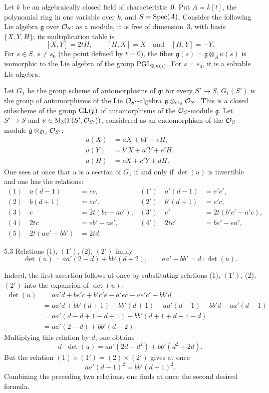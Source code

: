 \label{XIX.sec.5}
 Let $k$ be an algebraically closed field of characteristic~0. Put $A=k[t]$, the polynomial ring in one variable over $k$, and $S=\operatorname{Spec}(A)$. Consider the following Lie algebra $\mathfrak g$ over $\mathcal{O}_S$: as a module, it is free of dimension~3, with basis $\{X,Y,H\}$; its multiplication table is
\[
[X,Y]=2tH,\qquad[H,X]=X\quad\text{and}\quad[H,Y]=-Y.
\]
For $s\in S$, $s\ne s_0$ (the point defined by $t=0$), the fiber $\mathfrak g(s)=\mathfrak g\otimes_A\kappa(s)$ is isomorphic to the Lie algebra of the group $\operatorname{PGL}_{2,\kappa(s)}$. For $s=s_0$, it is a solvable Lie algebra.

 Let $G_1$ be the group scheme of automorphisms of $\mathfrak g$: for every $S'\to S$, $G_1(S')$ is the group of automorphisms of the Lie $\mathcal{O}_{S'}$-algebra $\mathfrak g\otimes_{\mathcal{O}_S}\mathcal{O}_{S'}$. This is a closed subscheme of the group $\operatorname{GL}(\mathfrak g)$ of automorphisms of the $\mathcal{O}_S$-module $\mathfrak g$. Let $S'\to S$ and $u\in\mathrm M_3(\Gamma(S',\mathcal{O}_{S'}))$, considered as an endomorphism of the $\mathcal{O}_S$-module $\mathfrak g\otimes_{\mathcal{O}_S}\mathcal{O}_{S'}$:
\[
\begin{aligned}
u(X)&=aX+bY+eH,\\
u(Y)&=b'X+a'Y+e'H,\\
u(H)&=cX+c'Y+dH.
\end{aligned}
\]
One sees at once that $u$ is a section of $G_1$ if and only if $\det(u)$ is invertible and one has the relations:{\renewcommand{\thefootnote}{(38)}}
\[
\begin{aligned}
(1)\quad a(d-1)&=ec,& (1')\quad a'(d-1)&=e'c',\\
(2)\quad b(d+1)&=ec',& (2')\quad b'(d+1)&=e'c,\\
(3)\quad e&=2t(bc-ac'),& (3')\quad e'&=2t(b'c'-a'c),\\
(4)\quad 2tc&=eb'-ae',& (4')\quad 2tc'&=be'-ea',\\
(5)\quad 2t(aa'-bb')&=2td.&&
\end{aligned}
\]

\begin{lemma}{5.3}\label{XIX.5.3}
Relations (1), $(1')$, (2), $(2')$ imply
\[
\det(u)=aa'(2-d)+bb'(d+2),\qquad aa'-bb'=d\cdot\det(u).
\]
\end{lemma}
Indeed, the first assertion follows at once by substituting relations (1), $(1')$, (2), $(2')$ into the expansion of $\det(u)$:
\[
\begin{aligned}
\det(u)&=aa'd+be'c+b'c'e-a'ec-ae'c'-bb'd\\
&=aa'd+bb'(d+1)+bb'(d+1)-aa'(d-1)-bb'd-aa'(d-1)\\
&=aa'(d-d+1-d+1)+bb'(d+1+d+1-d)\\
&=aa'(2-d)+bb'(d+2).
\end{aligned}
\]
Multiplying this relation by $d$, one obtains
\[
d\cdot\det(u)=aa'(2d-d^2)+bb'(d^2+2d).
\]
But the relation $(1)\times(1')=(2)\times(2')$ gives at once
\[
aa'(d-1)^2=bb'(d+1)^2.
\]
Combining the preceding two relations, one finds at once the second desired formula.

